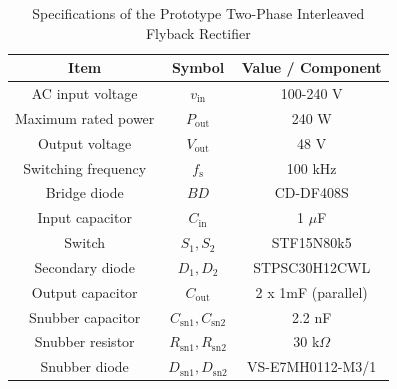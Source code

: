 \documentclass[lettersize,journal]{IEEEtran}
\begin{document}
\begin{table}[h]
    \caption{Specifications of the Prototype Two-Phase Interleaved Flyback Rectifier}
    \centering
    \footnotesize
    \setlength{\tabcolsep}{3pt} %
    \begin{tabular}{ccc}
        \hline
        \textbf{Item} & \textbf{Symbol} & \textbf{Value / Component} \\
        \hline \hline
        AC input voltage & $v_{\mathrm{in}}$ & 100-240 V \\
        Maximum rated power & $P_{\mathrm{out}}$ & 240 W \\
        Output voltage & $V_{\mathrm{out}}$ & 48 V \\
        Switching frequency & $f_{\mathrm{s}}$ & 100 kHz \\
        Bridge diode & $BD$ & CD-DF408S \\
        Input capacitor & $C_{\mathrm{in}}$ & 1 $\mu$F \\
        Switch & $S_1, S_2$ & STF15N80k5 \\
        Secondary diode & $D_1, D_2$ & STPSC30H12CWL \\
        Output capacitor & $C_{\mathrm{out}}$ & 2 x 1mF (parallel) \\
        Snubber capacitor & $C_{\mathrm{sn}1}, C_{\mathrm{sn}2}$ & 2.2 nF \\
        Snubber resistor & $R_{\mathrm{sn}1}, R_{\mathrm{sn}2}$ & 30 k$\Omega$ \\
        Snubber diode & $D_{\mathrm{sn}1}, D_{\mathrm{sn}2}$ & VS-E7MH0112-M3/1 \\
        \hline
    \end{tabular}
    \label{tab:prototype_rectifier}
\end{table}
\end{document}
